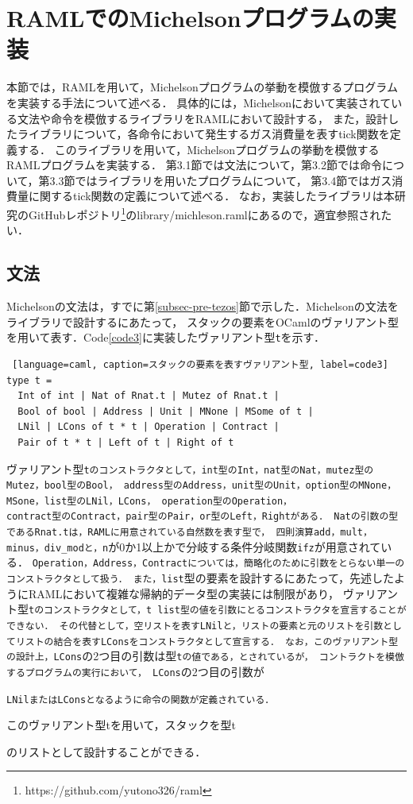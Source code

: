 \documentclass{kuisthesis}
\begin{document}
\section{RAMLでのMichelsonプログラムの実装} \label{sec-program}
本節では，RAMLを用いて，Michelsonプログラムの挙動を模倣するプログラムを実装する手法について述べる．
具体的には，Michelsonにおいて実装されている文法や命令を模倣するライブラリをRAMLにおいて設計する，
また，設計したライブラリについて，各命令において発生するガス消費量を表すtick関数を定義する．
このライブラリを用いて，Michelsonプログラムの挙動を模倣するRAMLプログラムを実装する．
第3.1節では文法について，第3.2節では命令について，第3.3節ではライブラリを用いたプログラムについて，
第3.4節ではガス消費量に関するtick関数の定義について述べる．
なお，実装したライブラリは本研究のGitHubレポジトリ\footnote{https://github.com/yutono326/raml}のlibrary/michleson.ramlにあるので，適宜参照されたい．

\subsection{文法} \label{subsec-pro-grammar}
Michelsonの文法は，すでに第\ref{subsec-pre-tezos}節で示した．Michelsonの文法をライブラリで設計するにあたって，
スタックの要素をOCamlのヴァリアント型を用いて表す．Code\ref{code3}に実装したヴァリアント型{\tt t}を示す．

\begin{lstlisting} [language=caml, caption=スタックの要素を表すヴァリアント型, label=code3]
type t =
  Int of int | Nat of Rnat.t | Mutez of Rnat.t |
  Bool of bool | Address | Unit | MNone | MSome of t |
  LNil | LCons of t * t | Operation | Contract |
  Pair of t * t | Left of t | Right of t 
\end{lstlisting}


ヴァリアント型{\tt tのコンストラクタとして，int型のInt，nat型のNat，mutez型のMutez，bool型のBool，
address型のAddress，unit型のUnit，option型のMNone，MSone，list型のLNil，LCons，
operation型のOperation，\\contract型のContract，pair型のPair，or型のLeft，Rightがある．
Natの引数の型であるRnat.tは，RAMLに用意されている自然数を表す型で，
四則演算add，mult，minus，div\_modと，n}が0か1以上かで分岐する条件分岐関数{\tt ifz}が用意されている．
{\tt Operation，Address，Contractについては，簡略化のために引数をとらない単一のコンストラクタとして扱う．
また，list}型の要素を設計するにあたって，先述したようにRAMLにおいて複雑な帰納的データ型の実装には制限があり，
ヴァリアント型{\tt tのコンストラクタとして，t list型の値を引数にとるコンストラクタを宣言することができない．
その代替として，空リストを表すLNilと，リストの要素と元のリストを引数としてリストの結合を表すLConsをコンストラクタとして宣言する．
なお，このヴァリアント型の設計上，LCons}の2つ目の引数は型{\tt tの値である，とされているが，
コントラクトを模倣するプログラムの実行において，
LCons}の2つ目の引数が{\tt LNilまたはLConsとなるように命令の関数が定義されている．

このヴァリアント型tを用いて，スタックを型t}のリストとして設計することができる．
\end{document}
